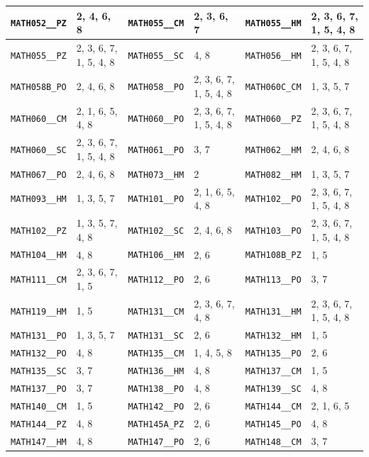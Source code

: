 \begin{longtable}{|l|l||l|l||l|l|}
    \verb|MATH052__PZ| & 2, 4, 6, 8 & \verb|MATH055__CM| & 2, 3, 6, 7 & \verb|MATH055__HM| & 2, 3, 6, 7, 1, 5, 4, 8\\\hline
    \verb|MATH055__PZ| & 2, 3, 6, 7, 1, 5, 4, 8 & \verb|MATH055__SC| & 4, 8 & \verb|MATH056__HM| & 2, 3, 6, 7, 1, 5, 4, 8\\\hline
    \verb|MATH058B_PO| & 2, 4, 6, 8 & \verb|MATH058__PO| & 2, 3, 6, 7, 1, 5, 4, 8 & \verb|MATH060C_CM| & 1, 3, 5, 7\\\hline
    \verb|MATH060__CM| & 2, 1, 6, 5, 4, 8 & \verb|MATH060__PO| & 2, 3, 6, 7, 1, 5, 4, 8 & \verb|MATH060__PZ| & 2, 3, 6, 7, 1, 5, 4, 8\\\hline
    \verb|MATH060__SC| & 2, 3, 6, 7, 1, 5, 4, 8 & \verb|MATH061__PO| & 3, 7 & \verb|MATH062__HM| & 2, 4, 6, 8\\\hline
    \verb|MATH067__PO| & 2, 4, 6, 8 & \verb|MATH073__HM| & 2 & \verb|MATH082__HM| & 1, 3, 5, 7\\\hline
    \verb|MATH093__HM| & 1, 3, 5, 7 & \verb|MATH101__PO| & 2, 1, 6, 5, 4, 8 & \verb|MATH102__PO| & 2, 3, 6, 7, 1, 5, 4, 8\\\hline
    \verb|MATH102__PZ| & 1, 3, 5, 7, 4, 8 & \verb|MATH102__SC| & 2, 4, 6, 8 & \verb|MATH103__PO| & 2, 3, 6, 7, 1, 5, 4, 8\\\hline
    \verb|MATH104__HM| & 4, 8 & \verb|MATH106__HM| & 2, 6 & \verb|MATH108B_PZ| & 1, 5\\\hline
    \verb|MATH111__CM| & 2, 3, 6, 7, 1, 5 & \verb|MATH112__PO| & 2, 6 & \verb|MATH113__PO| & 3, 7\\\hline
    \verb|MATH119__HM| & 1, 5 & \verb|MATH131__CM| & 2, 3, 6, 7, 4, 8 & \verb|MATH131__HM| & 2, 3, 6, 7, 1, 5, 4, 8\\\hline
    \verb|MATH131__PO| & 1, 3, 5, 7 & \verb|MATH131__SC| & 2, 6 & \verb|MATH132__HM| & 1, 5\\\hline
    \verb|MATH132__PO| & 4, 8 & \verb|MATH135__CM| & 1, 4, 5, 8 & \verb|MATH135__PO| & 2, 6\\\hline
    \verb|MATH135__SC| & 3, 7 & \verb|MATH136__HM| & 4, 8 & \verb|MATH137__CM| & 1, 5\\\hline
    \verb|MATH137__PO| & 3, 7 & \verb|MATH138__PO| & 4, 8 & \verb|MATH139__SC| & 4, 8\\\hline
    \verb|MATH140__CM| & 1, 5 & \verb|MATH142__PO| & 2, 6 & \verb|MATH144__CM| & 2, 1, 6, 5\\\hline
    \verb|MATH144__PZ| & 4, 8 & \verb|MATH145A_PZ| & 2, 6 & \verb|MATH145__PO| & 4, 8\\\hline
    \verb|MATH147__HM| & 4, 8 & \verb|MATH147__PO| & 2, 6 & \verb|MATH148__CM| & 3, 7\\\hline

\end{longtable}
